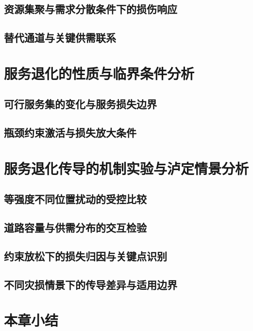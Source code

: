 \subsection{资源集聚与需求分散条件下的损伤响应}
\subsection{替代通道与关键供需联系}

\ThesisBlank

\section{服务退化的性质与临界条件分析}
\subsection{可行服务集的变化与服务损失边界}
\subsection{瓶颈约束激活与损失放大条件}

\ThesisBlank

\section{服务退化传导的机制实验与泸定情景分析}
\subsection{等强度不同位置扰动的受控比较}
\subsection{道路容量与供需分布的交互检验}
\subsection{约束放松下的损失归因与关键点识别}
\subsection{不同灾损情景下的传导差异与适用边界}

\ThesisBlank

\section{本章小结}
\ThesisBlank
